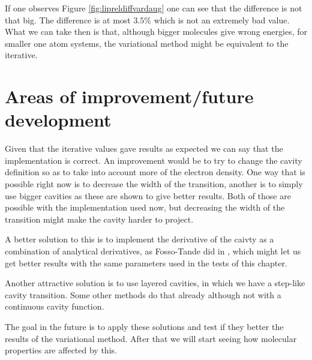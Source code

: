 \documentclass[../master_thesis.tex]{subfiles}
\begin{document}
If one observes Figure \ref{fig:lipreldiffvardaug} one can see that the difference is not
that big. The difference is at most $3.5\%$ which is not an extremely bad value.
What we can take then is that, although bigger molecules give wrong energies, for smaller
one atom systems, the variational method might be equivalent to the iterative.

\section{Areas of improvement/future development}
Given that the iterative values gave results as expected we can say that the
implementation is correct. An improvement would be to try to change the cavity
definition so as to take into account more of the electron density. One way that is
possible right now is to decrease the width of the transition, another is to simply use
bigger cavities as these are shown to give better results. Both of those are possible
with the implementation used now, but decreasing the width of the transition might
make the cavity harder to project.

A better solution to this is to implement the derivative of the caivty as
a combination of analytical derivatives, as Fosso-Tande did in \cite{FossoTande:2013ka}, which
might let us get better results with the same parameters used in the tests of this chapter.

Another attractive solution is to use layered cavities, in which we have a step-like
cavity transition. Some other methods do that already \cite{Tomasi:2005ipa} although
not with a continuous cavity function.

The goal in the future is to apply these solutions and test if they better the
results of the variational method. After that we will start seeing how molecular properties
are affected by this.




\biblio
\end{document}
